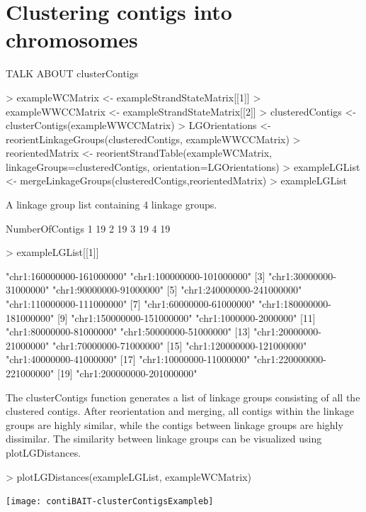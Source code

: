 \documentclass{article}
\begin{document}
\section{Clustering contigs into chromosomes}

TALK ABOUT clusterContigs

\begin{Schunk}
\begin{Sinput}
> exampleWCMatrix <- exampleStrandStateMatrix[[1]]
> exampleWWCCMatrix <- exampleStrandStateMatrix[[2]]
> clusteredContigs <- clusterContigs(exampleWWCCMatrix)
> LGOrientations <- reorientLinkageGroups(clusteredContigs, exampleWWCCMatrix)
> reorientedMatrix <- reorientStrandTable(exampleWCMatrix, linkageGroups=clusteredContigs, orientation=LGOrientations)
> exampleLGList <- mergeLinkageGroups(clusteredContigs,reorientedMatrix)
> exampleLGList
\end{Sinput}
\begin{Soutput}
A linkage group list containing  4  linkage groups.

  NumberOfContigs
1              19
2              19
3              19
4              19
\end{Soutput}
\begin{Sinput}
> exampleLGList[[1]]
\end{Sinput}
\begin{Soutput}
 [1] "chr1:160000000-161000000" "chr1:100000000-101000000"
 [3] "chr1:30000000-31000000"   "chr1:90000000-91000000"  
 [5] "chr1:240000000-241000000" "chr1:110000000-111000000"
 [7] "chr1:60000000-61000000"   "chr1:180000000-181000000"
 [9] "chr1:150000000-151000000" "chr1:1000000-2000000"    
[11] "chr1:80000000-81000000"   "chr1:50000000-51000000"  
[13] "chr1:20000000-21000000"   "chr1:70000000-71000000"  
[15] "chr1:120000000-121000000" "chr1:40000000-41000000"  
[17] "chr1:10000000-11000000"   "chr1:220000000-221000000"
[19] "chr1:200000000-201000000"
\end{Soutput}
\end{Schunk}


The clusterContigs function generates a list of linkage groups consisting of all the clustered contigs.  After reorientation and merging, all contigs within the linkage groups are highly similar, while the contigs between linkage groups are highly dissimilar.  The similarity between linkage groups can be visualized using plotLGDistances.

\begin{Schunk}
\begin{Sinput}
> plotLGDistances(exampleLGList, exampleWCMatrix)
\end{Sinput}
\end{Schunk}
\texttt{[image: contiBAIT-clusterContigsExampleb]}
\end{document}
